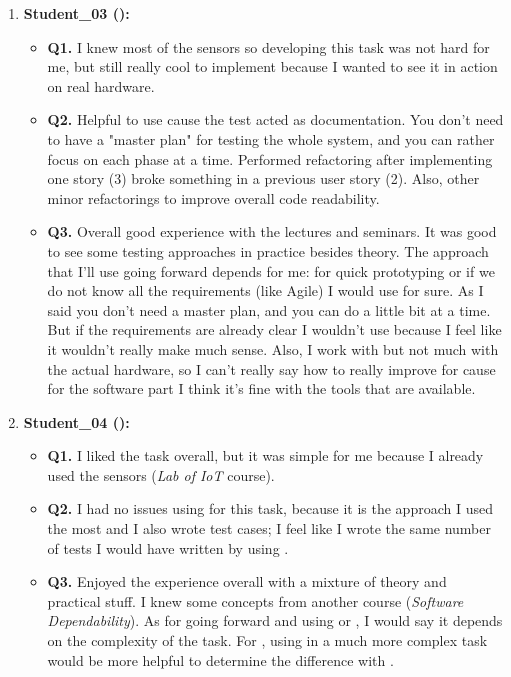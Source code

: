 \begin{enumerate}
    \item \textbf{Student\_03 (\tdd):}
    \begin{itemize}
        \item \textbf{Q1.} I knew most of the sensors so developing this task was not hard for me, but still really cool to implement because I wanted to see it in action on real hardware.
        \item \textbf{Q2.} Helpful to use \tdd cause the test acted as documentation. You don't need to have a "master plan" for testing the whole system, and you can rather focus on each phase at a time. Performed refactoring after implementing one story (3) broke something in a previous user story (2). Also, other minor refactorings to improve overall code readability.
        \item \textbf{Q3.} Overall good experience with the lectures and seminars. It was good to see some testing approaches in practice besides theory. The approach that I'll use going forward depends for me: for quick prototyping or if we do not know all the requirements (like Agile) I would use \tdd for sure. As I said you don't need a master plan, and you can do a little bit at a time. But if the requirements are already clear I wouldn't use \tdd because I feel like it wouldn't really make much sense. Also, I work with \ess but not much with the actual hardware, so I can't really say how to really improve \tdd for \ess cause for the software part I think it's fine with the tools that are available.
    \end{itemize}

    \item \textbf{Student\_04 (\tdd):}
    \begin{itemize}
        \item \textbf{Q1.} I liked the task overall, but it was simple for me because I already used the sensors (\textit{Lab of IoT} course). 
        \item \textbf{Q2.} I had no issues using \notdd for this task, because it is the approach I used the most and I also wrote test cases; I feel like I wrote the same number of tests I would have written by using \tdd.
        \item \textbf{Q3.} Enjoyed the experience overall with a mixture of theory and practical stuff. I knew some \tdd concepts from another course (\textit{Software Dependability}). As for \ess going forward and using \tdd or \notdd, I would say it depends on the complexity of the task. For \ess, using \tdd in a much more complex task would be more helpful to determine the difference with \notdd. 
    \end{itemize}


\end{enumerate}
